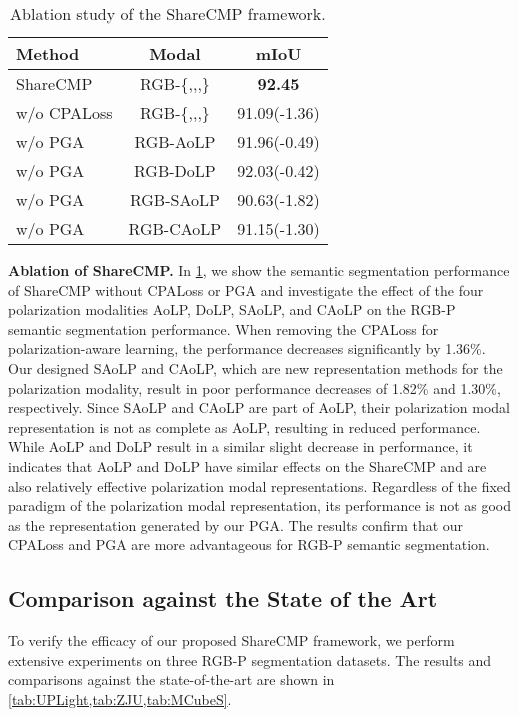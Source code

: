 \documentclass[10pt,twocolumn,letterpaper]{article}
\begin{document}
\begin{table}[t]
\begin{tabular}{@{}lcc@{}}
\toprule
Method      & Modal     & mIoU \\ \midrule
ShareCMP    & RGB-\{,,,\} & \textbf{92.45} \\ \midrule
w/o CPALoss & RGB-\{,,,\} & 91.09{\small (-1.36)} \\
w/o PGA     & RGB-AoLP  & 91.96{\small (-0.49)} \\
w/o PGA     & RGB-DoLP  & 92.03{\small (-0.42)} \\
w/o PGA     & RGB-SAoLP & 90.63{\small (-1.82)} \\
w/o PGA     & RGB-CAoLP & 91.15{\small (-1.30)} \\ \bottomrule
\end{tabular}

\caption{Ablation study of the ShareCMP framework.}
  \label{tab:ShareCMP}
\end{table} 

\medskip
\noindent
\textbf{Ablation of ShareCMP.}
In \cref{tab:ShareCMP}, we show the semantic segmentation performance of ShareCMP without CPALoss or PGA and investigate the effect of the four polarization modalities AoLP, DoLP, SAoLP, and CAoLP on the RGB-P semantic segmentation performance. When removing the CPALoss for polarization-aware learning, the performance decreases significantly by 1.36\%. Our designed SAoLP and CAoLP, which are new representation methods for the polarization modality, result in poor performance decreases of 1.82\% and 1.30\%, respectively. Since SAoLP and CAoLP are part of AoLP, their polarization modal representation is not as complete as AoLP, resulting in reduced performance. While AoLP and DoLP result in a similar slight decrease in performance, it indicates that AoLP and DoLP have similar effects on the ShareCMP and are also relatively effective polarization modal representations. Regardless of the fixed paradigm of the polarization modal representation, its performance is not as good as the representation generated by our PGA. The results confirm that our CPALoss and PGA are more advantageous for RGB-P semantic segmentation.


\subsection{Comparison against the State of the Art}
\label{sec:comparison_sota}


To verify the efficacy of our proposed ShareCMP framework, we perform extensive experiments on three RGB-P segmentation datasets. The results and comparisons against the state-of-the-art are shown in \cref{tab:UPLight,tab:ZJU,tab:MCubeS}.
\end{document}
